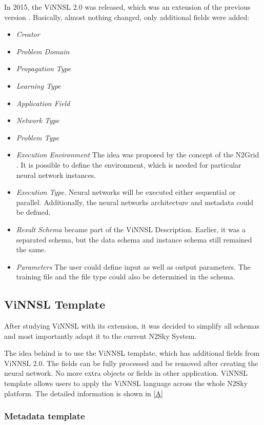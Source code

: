 In 2015, the ViNNSL 2.0 was released, which was an extension of the previous version \cite{ijcnn15}. Basically, almost nothing changed, only additional fields were added:
\begin{itemize}
\item \emph{Creator}
\item \emph{Problem Domain}
\item \emph{Propagation Type}
\item \emph{Learning Type}
\item \emph{Application Field}
\item \emph{Network Type}
\item \emph{Problem Type}
\item \emph{Execution Environment} The idea was proposed by the concept of the N2Grid \cite{schikuta2004n2grid}. It is possible to define the environment, which is needed for particular neural network instances. 
\item \emph{Execution Type.} Neural networks will be executed either sequential or parallel. Additionally, the neural networks architecture and metadata could be defined. 
\item \emph{Result Schema} became part of the ViNNSL Description. Earlier, it was a separated schema, but the data schema and instance schema still remained the same.
\item \emph{Parameters} The user could define input as well as output parameters. The training file and the file type could also be determined in the schema.
\end{itemize}

\subsection{ViNNSL Template}\label{ViNNSL Template}

After studying ViNNSL with its extension, it was decided to simplify all schemas and most importantly adapt it to the current N2Sky System.

The idea behind is to use the ViNNSL template, which has additional fields from ViNNSL 2.0. The fields can be fully processed and be removed after creating the neural network. No more extra objects or fields in other application. ViNNSL template allows users to apply the ViNNSL language across the whole N2Sky platform. The detailed information is shown in \autoref{A}

\subsubsection{Metadata template}\label{Metadata template}


